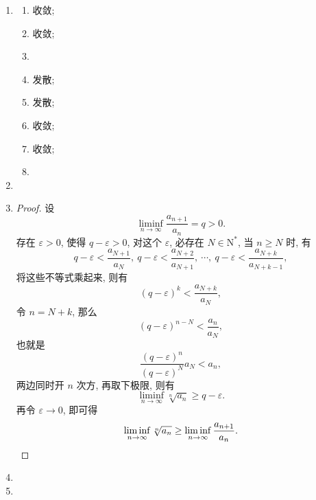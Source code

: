 \documentclass[a4paper, 11pt]{ctexart}
\begin{document}
\begin{enumerate}
    \item %
        \begin{multicols}{4}
            \begin{enumerate}[(1)]
                \item %
                    收敛;
                \item %
                    收敛;
                \item %
                \item %
                    发散;
                \item %
                    发散;
                \item %
                    收敛;
                \item %
                    收敛;
                \item %
            \end{enumerate}
        \end{multicols}
    \item %
    \item %
        \begin{proof}
            设
            \[
                \liminf_{n\to\infty}\frac{a_{n+1}}{a_n} = q > 0.    
            \]
            存在 $\varepsilon > 0$, 使得 $q - \varepsilon > 0$, 对这个 $\varepsilon$, 必存在 $N \in \mathrm{N}^*$, 当 $n \geq N$ 时, 有
            \[
                q - \varepsilon < \frac{a_{N+1}}{a_N},\ q - \varepsilon < \frac{a_{N+2}}{a_{N+1}},\ \cdots,\ q - \varepsilon < \frac{a_{N+k}}{a_{N+k-1}},    
            \]
            将这些不等式乘起来, 则有
            \[
                (q - \varepsilon)^k < \frac{a_{N+k}}{a_N},    
            \]
            令 $n = N+k$, 那么
            \[
                (q - \varepsilon)^{n-N} < \frac{a_n}{a_N},    
            \]
            也就是
            \[
                \frac{(q - \varepsilon)^n}{(q - \varepsilon)^N}a_N < a_n,    
            \]
            两边同时开 $n$ 次方, 再取下极限, 则有
            \[
                \liminf_{n\to\infty}\sqrt[n]{a_n} \geq q - \varepsilon.
            \]
            再令 $\varepsilon \to 0$, 即可得
            \[
                \liminf_{n\to\infty}\sqrt[n]{a_n} \geq \liminf_{n\to\infty}\frac{a_{n+1}}{a_n}. \qedhere    
            \]
        \end{proof}
    \item %
    \item %
\end{enumerate}
\end{document}
